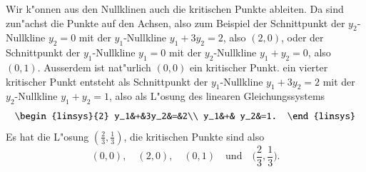 \begin{beispiel}
Wir k"onnen aus den Nullklinen auch die kritischen Punkte ableiten.
Da sind zun"achst die Punkte auf den Achsen, also zum Beispiel
der Schnittpunkt der $y_2$-Nullkline $y_2=0$ mit der $y_1$-Nullkline
$y_1+3y_2=2$, also $(2,0)$, oder der Schnittpunkt der
$y_1$-Nullkline $y_1=0$ mit der $y_2$-Nullkline $y_1+y_2=0$, also $(0,1)$.
Ausserdem ist nat"urlich $(0,0)$ ein kritischer Punkt.
ein vierter kritischer Punkt entsteht als Schnittpunkt
der $y_1$-Nullkline $y_1+3y_2=2$ mit der $y_2$-Nullkline $y_1+y_2=1$,
also als L"osung des linearen Gleichungssystems
\[
\begin{linsys}{2}
y_1&+&3y_2&=&2\\
y_1&+& y_2&=1.
\end{linsys}
\]
Es hat die L"osung $(\frac23,\frac13)$, die kritischen Punkte sind also
\[
(0,0),\quad
(2,0),\quad
(0,1)\quad\text{und}\quad
\biggl(\frac23,\frac13\biggr).
\]


\end{beispiel}

